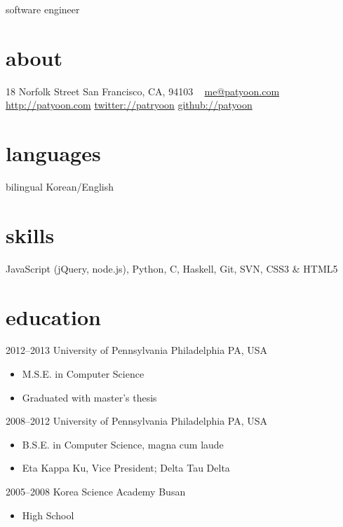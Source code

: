 \documentclass[]{patyoon-cv}
\begin{document}
       {software engineer}


\begin{aside}
  \section{about}
    18 Norfolk Street
    San Francisco, CA, 94103
    ~
    \href{mailto:me@patyoon.com}{me@patyoon.com}
    \href{http://patyoon.com}{http://patyoon.com}
    \href{http://twitter.com/patryoon}{twitter://patryoon}
    \href{http://github.com/patyoon}{github://patyoon}
  \section{languages}
    bilingual Korean/English
  \section{skills}
    JavaScript
    (jQuery, node.js),
    Python, C,
    Haskell, Git, SVN,
    CSS3 \& HTML5
\end{aside}

\section{education}

\begin{entrylist}
  \entry
    {2012–2013}
    {University of Pennsylvania}
    {Philadelphia PA, USA}
    {\begin{itemize}
      \item M.S.E. in Computer Science
      \item Graduated with master's thesis
      \end{itemize}
    }
  \entry
    {2008–2012}
    {University of Pennsylvania} 
    {Philadelphia PA, USA}
    {\begin{itemize}
      \item B.S.E. in Computer Science, magna cum laude
      \item Eta Kappa Ku, Vice President; Delta Tau Delta
    \end{itemize}}
  \entry
    {2005–2008}
    {Korea Science Academy} 
    {Busan }
    {\begin{itemize}
      \item High School
    \end{itemize}}
\end{entrylist}
\end{document}
